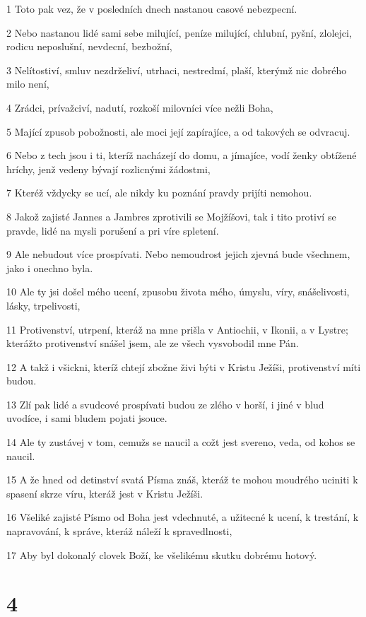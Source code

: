 \par 1 Toto pak vez, že v posledních dnech nastanou casové nebezpecní.
\par 2 Nebo nastanou lidé sami sebe milující, peníze milující, chlubní, pyšní, zlolejci, rodicu neposlušní, nevdecní, bezbožní,
\par 3 Nelítostiví, smluv nezdrželiví, utrhaci, nestredmí, plaší, kterýmž nic dobrého milo není,
\par 4 Zrádci, prívažciví, nadutí, rozkoší milovníci více nežli Boha,
\par 5 Mající zpusob pobožnosti, ale moci její zapírajíce, a od takových se odvracuj.
\par 6 Nebo z tech jsou i ti, kteríž nacházejí do domu, a jímajíce, vodí ženky obtížené hríchy, jenž vedeny bývají rozlicnými žádostmi,
\par 7 Kteréž vždycky se ucí, ale nikdy ku poznání pravdy prijíti nemohou.
\par 8 Jakož zajisté Jannes a Jambres zprotivili se Mojžíšovi, tak i tito protiví se pravde, lidé na mysli porušení a pri víre spletení.
\par 9 Ale nebudout více prospívati. Nebo nemoudrost jejich zjevná bude všechnem, jako i onechno byla.
\par 10 Ale ty jsi došel mého ucení, zpusobu života mého, úmyslu, víry, snášelivosti, lásky, trpelivosti,
\par 11 Protivenství, utrpení, kteráž na mne prišla v Antiochii, v Ikonii, a v Lystre; kterážto protivenství snášel jsem, ale ze všech vysvobodil mne Pán.
\par 12 A takž i všickni, kteríž chtejí zbožne živi býti v Kristu Ježíši, protivenství míti budou.
\par 13 Zlí pak lidé a svudcové prospívati budou ze zlého v horší, i jiné v blud uvodíce, i sami bludem pojati jsouce.
\par 14 Ale ty zustávej v tom, cemužs se naucil a cožt jest svereno, veda, od kohos se naucil.
\par 15 A že hned od detinství svatá Písma znáš, kteráž te mohou moudrého uciniti k spasení skrze víru, kteráž jest v Kristu Ježíši.
\par 16 Všeliké zajisté Písmo od Boha jest vdechnuté, a užitecné k ucení, k trestání, k napravování, k správe, kteráž náleží k spravedlnosti,
\par 17 Aby byl dokonalý clovek Boží, ke všelikému skutku dobrému hotový.

\chapter{4}


